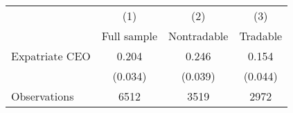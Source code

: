 \begin{tabular}{l*{3}{c}}
\hline\hline
                    &\multicolumn{1}{c}{(1)}&\multicolumn{1}{c}{(2)}&\multicolumn{1}{c}{(3)}\\
                    &\multicolumn{1}{c}{Full sample}&\multicolumn{1}{c}{Nontradable}&\multicolumn{1}{c}{Tradable}\\
\hline
Expatriate CEO      &       0.204&       0.246&       0.154\\
                    &     (0.034)&     (0.039)&     (0.044)\\
\hline
Observations        &        6512&        3519&        2972\\
\hline\hline
\end{tabular}

